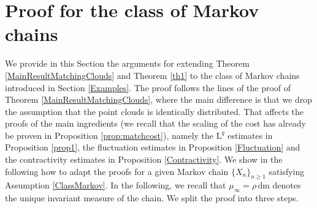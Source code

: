 \documentclass[11pt,a4paper,oneside]{amsart}
\numberwithin{equation}{section}
\newcommand{\dd}{\mathrm{d}}
\newcommand{\LL}{\mathrm{L}}
\newcommand{\m}{\mathrm{m}}
\begin{document}
\section{Proof for the class of Markov chains}\label{ClassMarkovAppendix}
%
We provide in this Section the arguments for extending Theorem \ref{MainResultMatchingClouds} and Theorem \ref{th1} to the class of Markov chains introduced in Section \ref{Examples}. The proof follows the lines of the proof of Theorem \ref{MainResultMatchingClouds}, where the main difference is that we drop the assumption that the point clouds is identically distributed. That affects the proofs of the main ingredients (we recall that the scaling of the cost has already be proven in Proposition \ref{prop:matchcost}), namely the $\LL^q$ estimates in Proposition \ref{prop1}, the fluctuation estimates in Proposition \ref{Fluctuation} and the contractivity estimates in Proposition \ref{Contractivity}. We show in the following how to adapt the proofs for a given Markov chain $\{X_n\}_{n\geq 1}$ satisfying Assumption \ref{ClassMarkov}. In the following, we recall that $\mu_\infty=\rho\,\dd\m$ denotes the unique invariant measure of the chain. We split the proof into three steps.

%
\medskip
%
\end{document}
